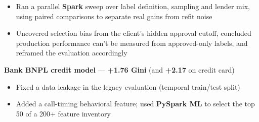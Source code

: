 \begin{zitemize}
\begin{itemize}
        \item Ran a parallel \textbf{Spark} sweep over label definition, sampling and lender mix, using paired comparisons to separate real gains from refit noise
        \item Uncovered selection bias from the client's hidden approval cutoff, concluded production performance can't be measured from approved-only labels, and reframed the evaluation accordingly
    \end{itemize}
    \item \textbf{Bank BNPL credit model} --- \textbf{+1.76 Gini} (and \textbf{+2.17} on credit card)
    \begin{itemize}
        \item Fixed a data leakage in the legacy evaluation (temporal train/test split)
        \item Added a call-timing behavioral feature; used \textbf{PySpark ML} to select the top 50 of a 200+ feature inventory
    \end{itemize}
\end{zitemize}
